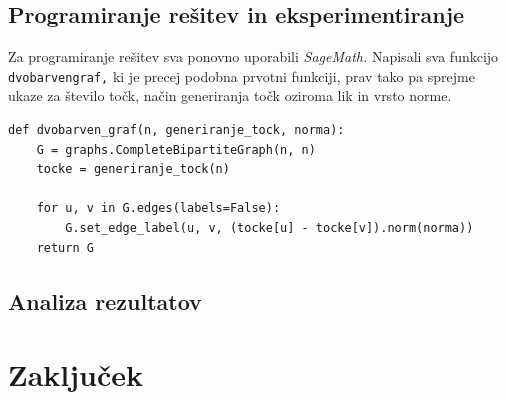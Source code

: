 \documentclass[a4paper, 11pt]{article}
\begin{document}
\subsection{Programiranje rešitev in eksperimentiranje}
Za programiranje rešitev sva ponovno uporabili \emph{SageMath.} Napisali sva funkcijo \texttt{dvobarven\underline{\space}graf,} ki je precej podobna prvotni funkciji,
prav tako pa sprejme ukaze za število točk, način generiranja točk oziroma lik in vrsto norme.

\begin{verbatim}
def dvobarven_graf(n, generiranje_tock, norma):
    G = graphs.CompleteBipartiteGraph(n, n)
    tocke = generiranje_tock(n)

    for u, v in G.edges(labels=False):
        G.set_edge_label(u, v, (tocke[u] - tocke[v]).norm(norma))
    return G
\end{verbatim}

\subsection{Analiza rezultatov}


\section{Zaključek}

\end{document}
